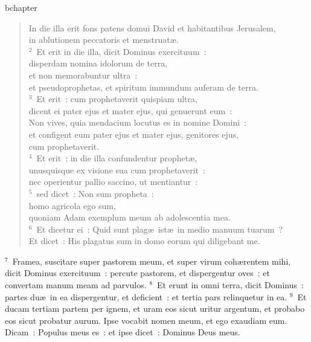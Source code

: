 bchapter\begin{flushleft}\begin{verse}\vspace{-19pt}\hspace{6pt}In die illa erit fons patens domui David et habitantibus Jerusalem,\\\hspace{6pt} in ablutionem peccatoris et menstruat\ae .\\
${}^{2}$~Et erit in die illa, dicit Dominus exercituum~:\\ disperdam nomina idolorum de terra,\\ et non memorabuntur ultra~:\\ et pseudoprophetas, et spiritum immundum auferam de terra.\\
${}^{3}$~Et erit~: cum prophetaverit quispiam ultra,\\ dicent ei pater ejus et mater ejus, qui genuerunt eum~:\\ Non vives, quia mendacium locutus es in nomine Domini~:\\ et configent eum pater ejus et mater ejus, genitores ejus,\\ cum prophetaverit.\\
${}^{4}$~Et erit~: in die illa confundentur prophet\ae ,\\ unusquisque ex visione sua cum prophetaverit~:\\ nec operientur pallio saccino, ut mentiantur~:\\
${}^{5}$~sed dicet~: Non sum propheta~:\\ homo agricola ego sum,\\ quoniam Adam exemplum meum ab adolescentia mea.\\
${}^{6}$~Et dicetur ei~: Quid sunt plag\ae\ ist\ae\ in medio manuum tuarum~?\\ Et dicet~: His plagatus sum in domo eorum qui diligebant me.\end{verse}\end{flushleft}


${}^{7}$~Framea, suscitare super pastorem meum, et super virum coh\ae rentem mihi, dicit Dominus exercituum~: percute pastorem, et dispergentur oves~: et convertam manum meam ad parvulos.
${}^{8}$~Et erunt in omni terra, dicit Dominus~: partes du\ae\ in ea dispergentur, et deficient~: et tertia pars relinquetur in ea.
${}^{9}$~Et ducam tertiam partem per ignem, et uram eos sicut uritur argentum, et probabo eos sicut probatur aurum. Ipse vocabit nomen meum, et ego exaudiam eum. Dicam~: Populus meus es~: et ipse dicet~: Dominus Deus meus.

